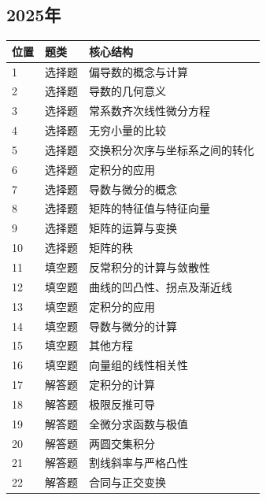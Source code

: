 \subsection*{2025年}
\begin{longtable}{p{9mm}p{25mm}p{109mm}}\toprule 位置&题类&核心结构\\\midrule\endhead
1&选择题&偏导数的概念与计算\\
2&选择题&导数的几何意义\\
3&选择题&常系数齐次线性微分方程\\
4&选择题&无穷小量的比较\\
5&选择题&交换积分次序与坐标系之间的转化\\
6&选择题&定积分的应用\\
7&选择题&导数与微分的概念\\
8&选择题&矩阵的特征值与特征向量\\
9&选择题&矩阵的运算与变换\\
10&选择题&矩阵的秩\\
11&填空题&反常积分的计算与敛散性\\
12&填空题&曲线的凹凸性、拐点及渐近线\\
13&填空题&定积分的应用\\
14&填空题&导数与微分的计算\\
15&填空题&其他方程\\
16&填空题&向量组的线性相关性\\
17&解答题&定积分的计算\\
18&解答题&极限反推可导\\
19&解答题&全微分求函数与极值\\
20&解答题&两圆交集积分\\
21&解答题&割线斜率与严格凸性\\
22&解答题&合同与正交变换\\
\bottomrule\end{longtable}
